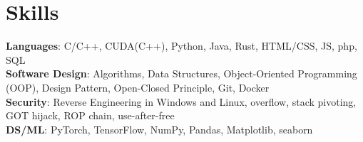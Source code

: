 \documentclass[letterpaper,11pt]{article}
\begin{document}
\section{Skills}
\begin{itemize}[leftmargin=0.15in, label={}]
    \small{
    \item{
        \textbf{Languages}{: C/C++, CUDA(C++), Python, Java, Rust,
        HTML/CSS, JS, php, SQL} \\
        \textbf{Software Design}{: Algorithms, Data Structures,
          Object-Oriented Programming (OOP),
        Design Pattern, Open-Closed Principle, Git, Docker} \\
        \textbf{Security}{: Reverse Engineering in Windows and Linux,
        overflow, stack pivoting, GOT hijack, ROP chain, use-after-free} \\
        \textbf{DS/ML}{: PyTorch, TensorFlow, NumPy, Pandas,
        Matplotlib, seaborn}
    }}
\end{itemize}

\end{document}
